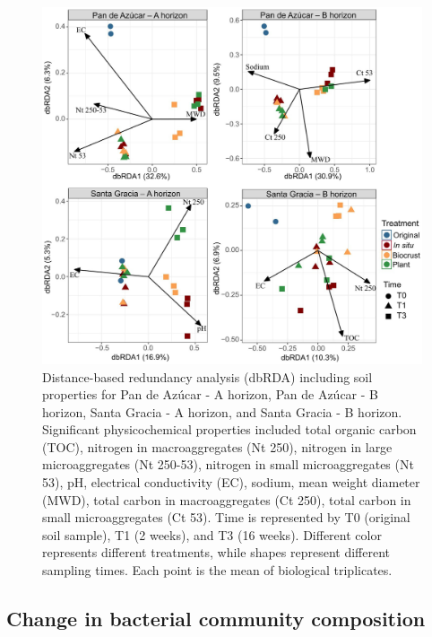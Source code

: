 \begin{figure}[H]
	\centering
	\includegraphics[width=1\textwidth]{img/M3-Figure_4.jpg}
	\caption{Distance-based redundancy analysis (dbRDA) including soil properties for Pan de Azúcar - A horizon, Pan de Azúcar - B horizon, Santa Gracia - A horizon, and Santa Gracia - B horizon. Significant physicochemical properties included total organic carbon (TOC), nitrogen in macroaggregates (Nt 250), nitrogen in large microaggregates (Nt 250-53), nitrogen in small microaggregates (Nt 53), pH, electrical conductivity (EC), sodium, mean weight diameter (MWD), total carbon in macroaggregates (Ct 250), total carbon in small microaggregates (Ct 53). Time is represented by T0 (original soil sample), T1 (2 weeks), and T3 (16 weeks). Different color represents different treatments, while shapes represent different sampling times. Each point is the mean of biological triplicates.}
	\label{fig:M3-F4}
\end{figure}

\subsection{Change in bacterial community composition}

